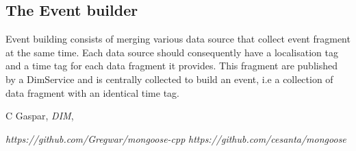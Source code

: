 \documentclass[11pt]{article}
\begin{document}
\subsection{The Event builder}
Event building consists of merging various data source that collect event fragment at the same time. Each data source should consequently have a localisation tag and a time tag for each data fragment it provides. This fragment are published by a DimService and is centrally collected to build an event, i.e a collection of data fragment with an identical time tag.
\begin{thebibliography}{9}

  C Gaspar,
  \emph{DIM},
  
\emph{https://github.com/Gregwar/mongoose-cpp}
\emph{https://github.com/cesanta/mongoose}
\end{thebibliography}
\end{document}
